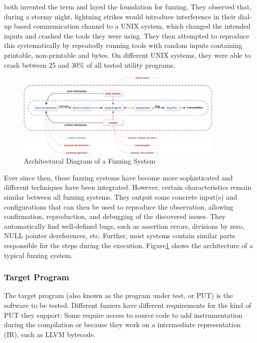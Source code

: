 \documentclass{article}
\begin{document}
\begin{multicols}{2}
    \citeauthor{UNIX} both invented the term and layed the foundation for fuzzing. They observed that, during a stormy night, lightning strikes would introduce interference in their dial-up based communication channel to a UNIX system, which changed the intended inputs and crashed the tools they were using. They then attempted to reproduce this systematically by repeatedly running tools with random inputs containing printable, non-printable and  bytes. On different UNIX systems, they were able to crash between 25 and 30\% of all tested utility programs.\cite{UNIX}

    \begin{figure}[!tp]
        \centering
        \includegraphics[width=0.9\textwidth]{assets/FuzzingSteps.jpg}
        \caption{Architectural Diagram of a Fuzzing System\cite{Science}}
        \label{fig:FuzzingSteps}
    \end{figure}

    Ever since then, these fuzzing systems have become more sophisticated and different techniques have been integrated. However, certain characteristics remain similar between all fuzzing systems. They output some concrete input(s) and configurations that can then be used to reproduce the observation, allowing confirmation, reproduction, and debugging of the discovered issues.\cite{EvaluatingFuzzTesting} They automatically find well-defined bugs, such as assertion errors, divisions by zero, NULL pointer dereferences, etc.\cite{AllYouEverWanted} Further, most systems contain similar parts responsible for the steps during the execution. Figure\ref{fig:FuzzingSteps} shows the architecture of a typical fuzzing system.

    \subsubsection{Target Program}
    The target program (also known as the program under test, or PUT) is the software to be tested. Different fuzzers have different requirements for the kind of PUT they support: Some require access to source code to add instrumentation during the compilation or because they work on a intermediate representation (IR), such as LLVM bytecode.


\end{multicols}
\end{document}
